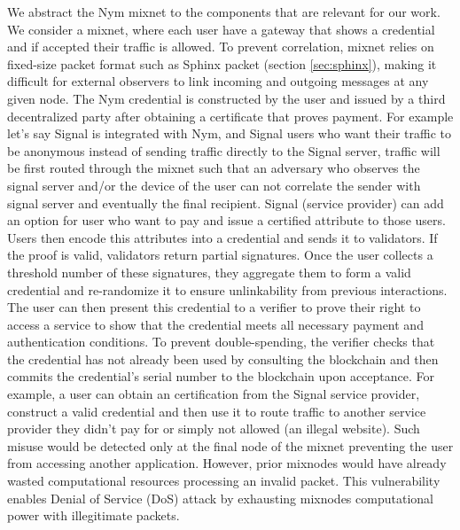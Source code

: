 %
%
We abstract the Nym mixnet to the components that are relevant for our
work. We consider a mixnet, where each user have a gateway that shows a
credential and if accepted their traffic is allowed.  To prevent
correlation, mixnet relies on fixed-size packet format such as Sphinx
packet (section \ref{sec:sphinx}), making it difficult for external
observers to link incoming and outgoing messages at any given node.  The
Nym credential is constructed by the user and issued by a third
decentralized party after obtaining a certificate that proves payment.  For
example let's say Signal is integrated with Nym, and Signal users who want
their traffic to be anonymous instead of sending traffic directly to the
Signal server, traffic will be first routed through the mixnet such that an
adversary who observes the signal server and/or the device of the user can
not correlate the sender with signal server and eventually the final
recipient. Signal (service provider) can add an option for user who want to
pay and issue a certified attribute to those users. Users then encode this
attributes into a credential and sends it to validators. If the proof is
valid, validators return partial signatures. Once the user collects a
threshold number of these signatures, they aggregate them to form a valid
credential and re-randomize it to ensure unlinkability from previous
interactions. The user can then present this credential to a verifier to
prove their right to access a service to show that the credential meets all
necessary payment and authentication conditions. To prevent
double-spending, the verifier checks that the credential has not already
been used by consulting the blockchain and then commits the credential's
serial number to the blockchain upon acceptance.  For example, a user can
obtain an certification from the Signal service provider, construct a valid
credential and then use it to route traffic to another service provider
they didn't pay for or simply not allowed (an illegal website).  Such
misuse would be detected only at the final node of the mixnet preventing
the user from accessing another application.  However, prior mixnodes would
have already wasted computational resources processing an invalid packet.
This vulnerability enables Denial of Service (DoS) attack by exhausting
mixnodes computational power with illegitimate packets.

